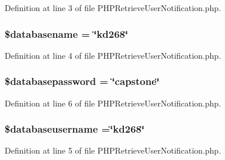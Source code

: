 Definition at line 3 of file P\-H\-P\-Retrieve\-User\-Notification.\-php.

\hypertarget{_p_h_p_retrieve_user_notification_8php_aace53f8afce81b52040cef0cd850138a}{
\subsubsection[{\$databasename}]{\setlength{\rightskip}{0pt plus 5cm}\$databasename = \char`\"{}kd268\char`\"{}}}\label{_p_h_p_retrieve_user_notification_8php_aace53f8afce81b52040cef0cd850138a}


Definition at line 4 of file P\-H\-P\-Retrieve\-User\-Notification.\-php.

\hypertarget{_p_h_p_retrieve_user_notification_8php_a1a07536b6a5f43f2d8f826bd2ee6c91a}{
\subsubsection[{\$databasepassword}]{\setlength{\rightskip}{0pt plus 5cm}\$databasepassword = \char`\"{}capstone\char`\"{}}}\label{_p_h_p_retrieve_user_notification_8php_a1a07536b6a5f43f2d8f826bd2ee6c91a}


Definition at line 6 of file P\-H\-P\-Retrieve\-User\-Notification.\-php.

\hypertarget{_p_h_p_retrieve_user_notification_8php_a251bf75f510d7c8b556c65d7c30e911f}{
\subsubsection[{\$databaseusername}]{\setlength{\rightskip}{0pt plus 5cm}\$databaseusername =\char`\"{}kd268\char`\"{}}}\label{_p_h_p_retrieve_user_notification_8php_a251bf75f510d7c8b556c65d7c30e911f}


Definition at line 5 of file P\-H\-P\-Retrieve\-User\-Notification.\-php.

